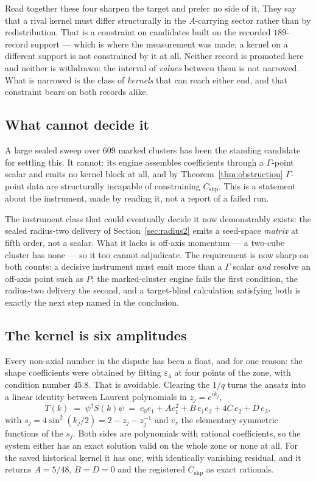 \documentclass[11pt]{article}
\theoremstyle{plain}
\theoremstyle{definition}
\theoremstyle{remark}
\newcommand{\chk}[1]{}
\begin{document}
Read together these four sharpen the target and prefer no side of it. They say
that a rival kernel must differ structurally in the $A$-carrying sector rather
than by redistribution. That is a constraint on candidates built on the
recorded $189$-record support --- which is where the measurement was made; a
kernel on a different support is not constrained by it at all. Neither record is promoted here and neither is withdrawn: the interval of
\emph{values} between them is not narrowed. What is narrowed is the class of
\emph{kernels} that can reach either end, and that constraint bears on both
records alike.

\subsection{What cannot decide it}

A large sealed sweep over $609$ marked clusters has been the standing candidate
for settling this. It cannot: its engine assembles coefficients through a
$\Gamma$-point scalar and emits no kernel block at all, and by
Theorem~\ref{thm:obstruction} $\Gamma$-point data are structurally incapable of
constraining $C_{\mathrm{shp}}$. This is a statement about the instrument, made
by reading it, not a report of a failed run.
\chk{FINDING: the marked-cluster engine emits the Gamma scalar only — a completed 609-sweep cannot decide C\_shp}

The instrument class that could eventually decide it now demonstrably
exists: the sealed radius-two delivery of Section~\ref{sec:radius2} emits a
seed-space \emph{matrix} at fifth order, not a scalar. What it lacks is
off-axis momentum --- a two-cube cluster has none --- so it too cannot
adjudicate. The requirement is now sharp on both counts: a decisive
instrument must emit more than a $\Gamma$ scalar \emph{and} resolve an
off-axis point such as $P$; the marked-cluster engine fails the first
condition, the radius-two delivery the second, and a target-blind
calculation satisfying both is exactly the next step named in the
conclusion.

\subsection{The kernel is six amplitudes}\label{sec:orbits}

Every non-axial number in the dispute has been a float, and for one reason: the
shape coefficients were obtained by fitting $\varepsilon_4$ at four points of
the zone, with condition number $45.8$. That is avoidable. Clearing the $1/q$
turns the ansatz into a linear identity between Laurent polynomials in
$z_j=e^{ik_j}$,
\[
  T(k)\;=\;\psi^{\dagger}S(k)\psi
   \;=\;c_0e_1+Ae_1^{2}+B\,e_1e_2+4C\,e_2+D\,e_3 ,
\]
with $s_j=4\sin^2(k_j/2)=2-z_j-z_j^{-1}$ and $e_r$ the elementary symmetric
functions of the $s_j$. Both sides are polynomials with rational coefficients,
so the system either has an exact solution valid on the whole zone or none at
all. For the saved historical kernel it has one, with identically vanishing
residual, and it returns $A=5/48$, $B=D=0$ and the registered $C_{\mathrm{shp}}$
as exact rationals.
\chk{the shape coefficients are solved, not fitted: A = 5/48, B = D = 0 exactly}
\end{document}
